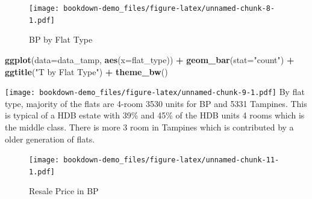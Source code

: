 \documentclass[]{book}
\newenvironment{Shaded}{\begin{snugshade}}{\end{snugshade}}
\newcommand{\KeywordTok}[1]{\textcolor[rgb]{0.13,0.29,0.53}{\textbf{#1}}}
\newcommand{\DataTypeTok}[1]{\textcolor[rgb]{0.13,0.29,0.53}{#1}}
\newcommand{\StringTok}[1]{\textcolor[rgb]{0.31,0.60,0.02}{#1}}
\newcommand{\OperatorTok}[1]{\textcolor[rgb]{0.81,0.36,0.00}{\textbf{#1}}}
\newcommand{\NormalTok}[1]{#1}
\begin{document}
\begin{figure}
\centering
\texttt{[image: bookdown-demo\_files/figure-latex/unnamed-chunk-8-1.pdf]}
\caption{\label{fig:unnamed-chunk-8}\label{fig:figs}BP by Flat Type}
\end{figure}

\begin{Shaded}
\begin{Highlighting}[]
\KeywordTok{ggplot}\NormalTok{(}\DataTypeTok{data=}\NormalTok{data_tamp, }\KeywordTok{aes}\NormalTok{(}\DataTypeTok{x=}\NormalTok{flat_type)) }\OperatorTok{+}
\StringTok{    }\KeywordTok{geom_bar}\NormalTok{(}\DataTypeTok{stat=}\StringTok{"count"}\NormalTok{) }\OperatorTok{+}\StringTok{ }\KeywordTok{ggtitle}\NormalTok{(}\StringTok{"T by Flat Type"}\NormalTok{) }\OperatorTok{+}
\StringTok{    }\KeywordTok{theme_bw}\NormalTok{()}
\end{Highlighting}
\end{Shaded}

\texttt{[image: bookdown-demo\_files/figure-latex/unnamed-chunk-9-1.pdf]}
By flat type, majority of the flats are 4-room 3530 units for BP and
5331 Tampines. This is typical of a HDB estate with 39\% and 45\% of the
HDB units 4 rooms which is the middle class. There is more 3 room in
Tampines which is contributed by a older generation of flats.

\begin{Shaded}
\end{Shaded}

\begin{figure}
\centering
\texttt{[image: bookdown-demo\_files/figure-latex/unnamed-chunk-11-1.pdf]}
\caption{\label{fig:unnamed-chunk-11}\label{fig:figs}Resale Price in BP}
\end{figure}

\begin{Shaded}
\end{Shaded}
\end{document}
